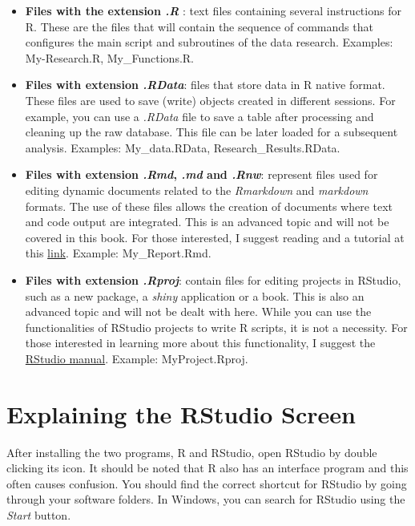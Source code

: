 \documentclass[11pt,]{book}
\begin{document}
\begin{itemize}
\item
  \textbf{Files with the extension \emph{.R }}: text files containing
  several instructions for R. These are the files that will contain the
  sequence of commands that configures the main script and subroutines
  of the data research. Examples: My-Research.R, My\_Functions.R.
\item
  \textbf{Files with extension \emph{.RData}}: files that store data in
  R native format. These files are used to save (write) objects created
  in different sessions. For example, you can use a \emph{.RData} file
  to save a table after processing and cleaning up the raw database.
  This file can be later loaded for a subsequent analysis. Examples:
  My\_data.RData, Research\_Results.RData.
\item
  \textbf{Files with extension \emph{.Rmd}, \emph{.md} and \emph{.Rnw}}:
  represent files used for editing dynamic documents related to the
  \emph{Rmarkdown} and \emph{markdown} formats. The use of these files
  allows the creation of documents where text and code output are
  integrated. This is an advanced topic and will not be covered in this
  book. For those interested, I suggest reading \citet{baumer2014r} and
  a tutorial at this
  \href{http://rmarkdown.rstudio.com/index.html}{link}. Example:
  My\_Report.Rmd.  
\item
  \textbf{Files with extension \emph{.Rproj}}: contain files for editing
  projects in RStudio, such as a new package, a \emph{shiny} application
  or a book. This is also an advanced topic and will not be dealt with
  here. While you can use the functionalities of RStudio projects to
  write R scripts, it is not a necessity. For those interested in
  learning more about this functionality, I suggest the
  \href{https://support.rstudio.com/hc/en-us/articles/200526207-Using-Projects}{RStudio
  manual}. Example: MyProject.Rproj. 
\end{itemize}

\section{Explaining the RStudio
Screen}\label{explaining-the-rstudio-screen}

After installing the two programs, R and RStudio, open RStudio by double
clicking its icon. It should be noted that R also has an interface
program and this often causes confusion. You should find the correct
shortcut for RStudio by going through your software folders. In Windows,
you can search for RStudio using the \emph{Start} button.
\end{document}
